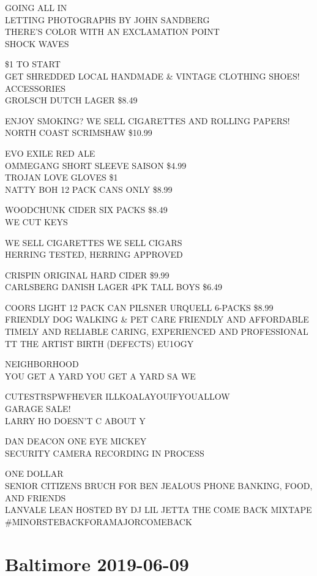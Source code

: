 \documentclass[10pt,letterpaper]{article}
\begin{document}
GOING ALL IN\\
LETTING PHOTOGRAPHS BY JOHN SANDBERG\\
THERE'S COLOR WITH AN EXCLAMATION POINT\\
SHOCK WAVES

\$1 TO START\\
GET SHREDDED LOCAL HANDMADE \& VINTAGE CLOTHING SHOES! ACCESSORIES\\
GROLSCH DUTCH LAGER \$8.49

ENJOY SMOKING?  WE SELL CIGARETTES AND ROLLING PAPERS!\\
NORTH COAST SCRIMSHAW \$10.99

EVO EXILE RED ALE\\
OMMEGANG SHORT SLEEVE SAISON \$4.99\\
TROJAN LOVE GLOVES \$1\\
NATTY BOH 12 PACK CANS ONLY \$8.99

WOODCHUNK CIDER SIX PACKS \$8.49\\
WE CUT KEYS

WE SELL CIGARETTES WE SELL CIGARS\\
HERRING TESTED, HERRING APPROVED

CRISPIN ORIGINAL HARD CIDER \$9.99\\
CARLSBERG DANISH LAGER 4PK TALL BOYS \$6.49

COORS LIGHT 12 PACK CAN PILSNER URQUELL 6{-}PACKS \$8.99\\
FRIENDLY DOG WALKING \& PET CARE FRIENDLY AND AFFORDABLE TIMELY AND RELIABLE CARING, EXPERIENCED AND PROFESSIONAL\\
TT THE ARTIST BIRTH (DEFECTS) EU1OGY

NEIGHBORHOOD\\
YOU GET A YARD YOU GET A YARD SA WE

CUTESTRSPWFHEVER ILLKOALAYOUIFYOUALLOW\\
GARAGE SALE!\\
LARRY HO DOESN'T C ABOUT Y

DAN DEACON ONE EYE MICKEY\\
SECURITY CAMERA RECORDING IN PROCESS

ONE DOLLAR\\
SENIOR CITIZENS BRUCH FOR BEN JEALOUS PHONE BANKING, FOOD, AND FRIENDS\\
LANVALE LEAN HOSTED BY DJ LIL JETTA THE COME BACK MIXTAPE \#MINORSTEBACKFORAMAJORCOMEBACK


\section*{Baltimore 2019-06-09}
\end{document}
